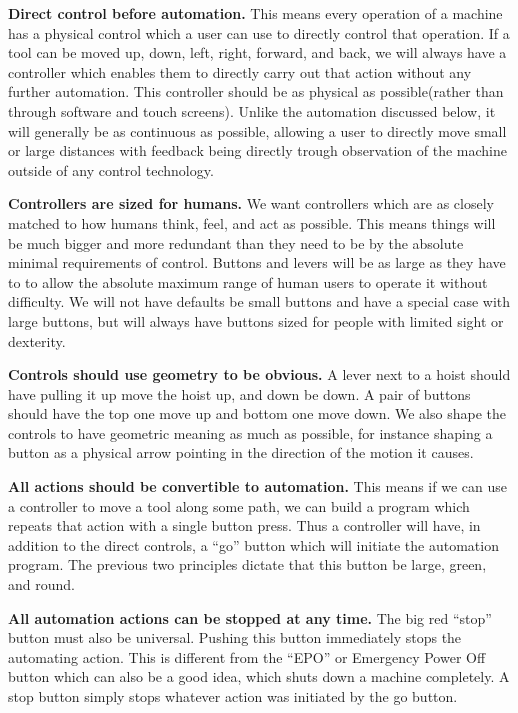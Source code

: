 \textbf{Direct control before automation.}  This means every operation of a machine has a physical control which a user can use to directly control that operation.  If a tool can be moved up, down, left, right, forward, and back, we will always have a controller which enables them to directly carry out that action without any further automation.  This controller should be as physical as possible(rather than through software and touch screens).  Unlike the automation discussed below, it will generally be as continuous as possible, allowing a user to directly move small or large distances with feedback being directly trough observation of the machine outside of any control technology.

\textbf{Controllers are sized for humans.}  We want controllers which are as closely matched to how humans think, feel, and act as possible.  This means things will be much bigger and more redundant than they need to be by the absolute minimal requirements of control.  Buttons and levers will be as large as they have to to allow the absolute maximum range of human users to operate it without difficulty.  We will not have defaults be small buttons and have a special case with large buttons, but will always have buttons sized for people with limited sight or dexterity.  

\textbf{Controls should use geometry to be obvious.}  A lever next to a hoist should have pulling it up move the hoist up, and down be down.  A pair of buttons should have the top one move up and bottom one move down.  We also shape the controls to have geometric meaning as much as possible, for instance shaping a button as a physical arrow pointing in the direction of the motion it causes.  

\textbf{All actions should be convertible to automation.}  This means if we can use a controller to move a tool along some path, we can build a program which repeats that action with a single button press.  Thus a controller will have, in addition to the direct controls, a ``go'' button which will initiate the automation program.  The previous two principles dictate that this button be large, green, and round.

\textbf{All automation actions can be stopped at any time.}  The big red ``stop'' button must also be universal. Pushing this button immediately stops the automating action.  This is different from the ``EPO'' or Emergency Power Off button which can also be a good idea, which shuts down a machine completely.  A stop button simply stops whatever action was initiated by the go button.

